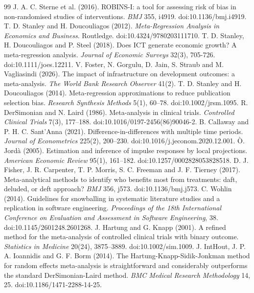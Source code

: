 \documentclass[11pt,a4paper]{article}
\begin{document}
\begin{thebibliography}{99}
 J. A. C. Sterne et al. (2016). ROBINS-I: a tool for assessing risk of bias in non-randomised studies of interventions. \emph{BMJ} 355, i4919. doi:10.1136/bmj.i4919.
 T. D. Stanley and H. Doucouliagos (2012). \emph{Meta-Regression Analysis in Economics and Business}. Routledge. doi:10.4324/9780203111710.
 T. D. Stanley, H. Doucouliagos and P. Steel (2018). Does ICT generate economic growth? A meta-regression analysis. \emph{Journal of Economic Surveys} 32(3), 705-726. doi:10.1111/joes.12211.
 V. Foster, N. Gorgulu, D. Jain, S. Straub and M. Vagliasindi (2026). The impact of infrastructure on development outcomes: a meta-analysis. \emph{The World Bank Research Observer} 41(2).
 T. D. Stanley and H. Doucouliagos (2014). Meta-regression approximations to reduce publication selection bias. \emph{Research Synthesis Methods} 5(1), 60--78. doi:10.1002/jrsm.1095.
 R. DerSimonian and N. Laird (1986). Meta-analysis in clinical trials. \emph{Controlled Clinical Trials} 7(3), 177--188. doi:10.1016/0197-2456(86)90046-2.
 B. Callaway and P. H. C. Sant'Anna (2021). Difference-in-differences with multiple time periods. \emph{Journal of Econometrics} 225(2), 200--230. doi:10.1016/j.jeconom.2020.12.001.
 \`O. Jord\`a (2005). Estimation and inference of impulse responses by local projections. \emph{American Economic Review} 95(1), 161--182. doi:10.1257/0002828053828518.
 D. J. Fisher, J. R. Carpenter, T. P. Morris, S. C. Freeman and J. F. Tierney (2017). Meta-analytical methods to identify who benefits most from treatments: daft, deluded, or deft approach? \emph{BMJ} 356, j573. doi:10.1136/bmj.j573.
 C. Wohlin (2014). Guidelines for snowballing in systematic literature studies and a replication in software engineering. \emph{Proceedings of the 18th International Conference on Evaluation and Assessment in Software Engineering}, 38. doi:10.1145/2601248.2601268.
 J. Hartung and G. Knapp (2001). A refined method for the meta-analysis of controlled clinical trials with binary outcome. \emph{Statistics in Medicine} 20(24), 3875--3889. doi:10.1002/sim.1009.
 J. IntHout, J. P. A. Ioannidis and G. F. Borm (2014). The Hartung-Knapp-Sidik-Jonkman method for random effects meta-analysis is straightforward and considerably outperforms the standard DerSimonian-Laird method. \emph{BMC Medical Research Methodology} 14, 25. doi:10.1186/1471-2288-14-25.
\end{thebibliography}
\end{document}
